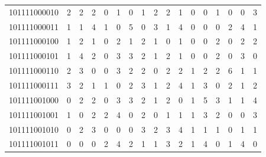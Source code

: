 \documentclass[10pt,a4paper]{article}
\begin{document}
\begin{longtable}{ |c|c|c|c|c|c|c|c|c|c|c|c|c|c|c|c|c| }
    101111000010              & 2                            & 2                                & 2                            & 0                              & 1   & 0   & 1   & 2   & 2   & 1   & 0   & 0   & 1   & 0   & 0   & 3   \\
    101111000011              & 1                            & 1                                & 4                            & 1                              & 0   & 5   & 0   & 3   & 1   & 4   & 0   & 0   & 0   & 2   & 4   & 1   \\
    101111000100              & 1                            & 2                                & 1                            & 0                              & 2   & 1   & 2   & 1   & 0   & 1   & 0   & 0   & 2   & 0   & 2   & 2   \\
    101111000101              & 1                            & 4                                & 2                            & 0                              & 3   & 3   & 2   & 1   & 2   & 1   & 0   & 0   & 2   & 0   & 3   & 0   \\
    101111000110              & 2                            & 3                                & 0                            & 0                              & 3   & 2   & 2   & 0   & 2   & 2   & 1   & 2   & 2   & 6   & 1   & 1   \\
    101111000111              & 3                            & 2                                & 1                            & 1                              & 0   & 2   & 3   & 1   & 2   & 4   & 1   & 3   & 0   & 2   & 1   & 2   \\
    101111001000              & 0                            & 2                                & 2                            & 0                              & 3   & 3   & 2   & 1   & 2   & 0   & 1   & 5   & 3   & 1   & 1   & 4   \\
    101111001001              & 1                            & 0                                & 2                            & 2                              & 4   & 0   & 2   & 0   & 1   & 1   & 1   & 3   & 2   & 0   & 0   & 3   \\
    101111001010              & 0                            & 2                                & 3                            & 0                              & 0   & 0   & 3   & 2   & 3   & 4   & 1   & 1   & 1   & 0   & 1   & 1   \\
    101111001011              & 0                            & 0                                & 0                            & 2                              & 4   & 2   & 1   & 1   & 3   & 2   & 1   & 4   & 0   & 1   & 4   & 0   \\

\end{longtable}
\end{document}
